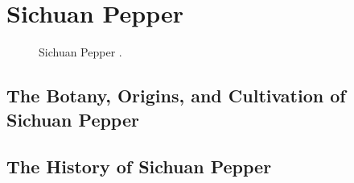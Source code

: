\section{Sichuan Pepper}
\label{sec:sichuan_pepper}



\begin{figure}[!ht]
	\vspace{-4ex}
	\centering
	\hfill
	\hfill
	\caption{Sichuan Pepper \textit{}.}
	\label{fig:sichuan_pepper_imgs}
\end{figure}

\subsection{The Botany, Origins, and Cultivation of Sichuan Pepper}

\subsection{The History of Sichuan Pepper}

